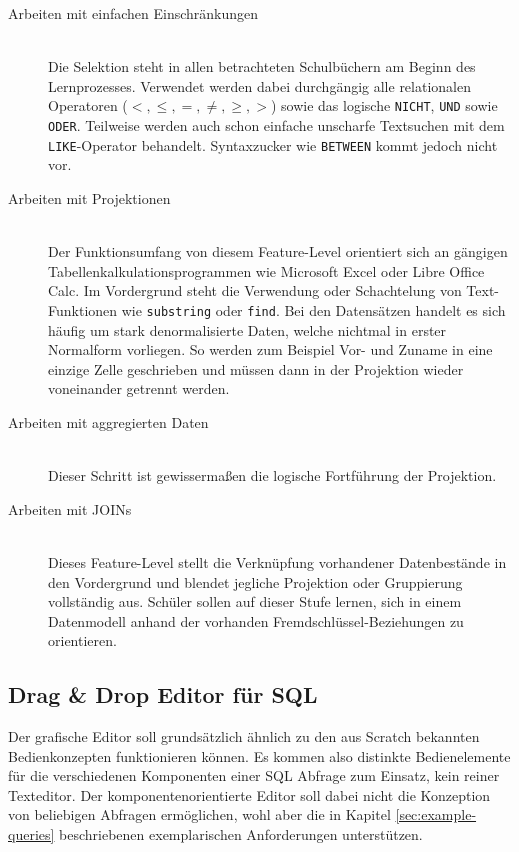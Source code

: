 \begin{description}
\item[Arbeiten mit einfachen Einschränkungen] \hfill \\
  Die Selektion steht in allen betrachteten Schulbüchern am Beginn des Lernprozesses. Verwendet werden dabei durchgängig alle relationalen Operatoren ($<, \leq, =, \neq, \geq, >$) sowie das logische \lstinline{NICHT}, \lstinline{UND} sowie \lstinline{ODER}. Teilweise werden auch schon einfache unscharfe Textsuchen mit dem \lstinline{LIKE}-Operator behandelt. Syntaxzucker wie \lstinline{BETWEEN} kommt jedoch nicht vor.

\item[Arbeiten mit Projektionen] \hfill \\
  Der Funktionsumfang von diesem Feature-Level orientiert sich an gängigen Tabellenkalkulationsprogrammen wie Microsoft Excel oder Libre Office Calc. Im Vordergrund steht die Verwendung oder Schachtelung von Text-Funktionen wie \lstinline{substring} oder \lstinline{find}. Bei den Datensätzen handelt es sich häufig um stark denormalisierte Daten, welche nichtmal in erster Normalform vorliegen. So werden zum Beispiel Vor- und Zuname in eine einzige Zelle geschrieben und müssen dann in der Projektion wieder voneinander getrennt werden.

\item[Arbeiten mit aggregierten Daten] \hfill \\
  Dieser Schritt ist gewissermaßen die logische Fortführung der Projektion.

\item[Arbeiten mit JOINs] \hfill \\
  Dieses Feature-Level stellt die Verknüpfung vorhandener Datenbestände in den Vordergrund und blendet jegliche Projektion oder Gruppierung vollständig aus. Schüler sollen auf dieser Stufe lernen, sich in einem Datenmodell anhand der vorhanden Fremdschlüssel-Beziehungen zu orientieren.
\end{description}

\subsection{Drag \& Drop Editor für SQL}
\label{sec:design-sql-editor}

Der grafische Editor soll grundsätzlich ähnlich zu den aus Scratch bekannten Bedienkonzepten funktionieren können. Es kommen also distinkte Bedienelemente für die verschiedenen Komponenten einer SQL Abfrage zum Einsatz, kein reiner Texteditor. Der komponentenorientierte Editor soll dabei nicht die Konzeption von beliebigen Abfragen ermöglichen, wohl aber die in Kapitel \ref{sec:example-queries}  beschriebenen exemplarischen Anforderungen unterstützen. 

